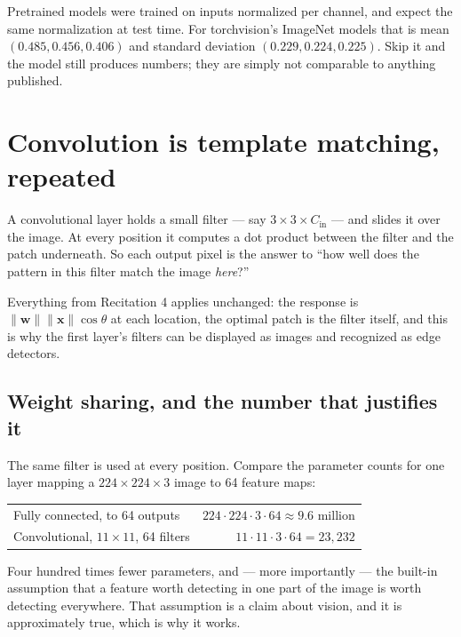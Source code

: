 \documentclass[11pt]{article}
\begin{document}
Pretrained models were trained on inputs normalized per channel, and expect the
same normalization at test time. For torchvision's ImageNet models that is mean
$(0.485, 0.456, 0.406)$ and standard deviation $(0.229, 0.224, 0.225)$. Skip it
and the model still produces numbers; they are simply not comparable to
anything published.

\section{Convolution is template matching, repeated}

A convolutional layer holds a small filter --- say $3\times3\times C_{\text{in}}$
--- and slides it over the image. At every position it computes a dot product
between the filter and the patch underneath. So each output pixel is the answer
to ``how well does the pattern in this filter match the image \emph{here}?''

Everything from Recitation 4 applies unchanged: the response is
$\|\boldsymbol{w}\|\|\boldsymbol{x}\|\cos\theta$ at each location, the optimal
patch is the filter itself, and this is why the first layer's filters can be
displayed as images and recognized as edge detectors.

\subsection{Weight sharing, and the number that justifies it}

The same filter is used at every position. Compare the parameter counts for one
layer mapping a $224 \times 224 \times 3$ image to 64 feature maps:

\begin{center}
\begin{tabular}{@{}lr@{}}
\toprule
Fully connected, to 64 outputs & $224 \cdot 224 \cdot 3 \cdot 64 \approx 9.6$ million \\
Convolutional, $11 \times 11$, 64 filters & $11 \cdot 11 \cdot 3 \cdot 64 = 23{,}232$ \\
\bottomrule
\end{tabular}
\end{center}

Four hundred times fewer parameters, and --- more importantly --- the built-in
assumption that a feature worth detecting in one part of the image is worth
detecting everywhere. That assumption is a claim about vision, and it is
approximately true, which is why it works.
\end{document}
